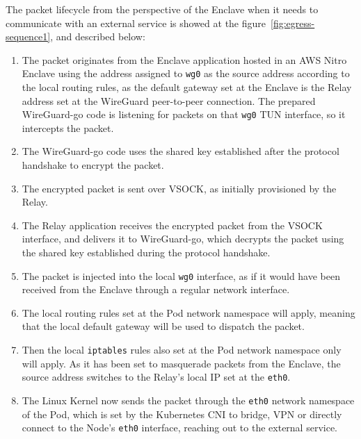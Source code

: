 \documentclass[a4paper, twocolumn]{article}
\begin{document}
The packet lifecycle from the perspective of the Enclave when it needs to
communicate with an external service is showed at the
figure~\ref{fig:egress-sequence1}, and described below:

\begin{enumerate}

\item The packet originates from the Enclave application hosted in an AWS Nitro
Enclave using the address assigned to \texttt{wg0} as the source address
according to the local routing rules, as the default gateway set at the
Enclave is the Relay address set at the WireGuard peer-to-peer connection.
The prepared WireGuard-go code is listening for packets on that \texttt{wg0}
TUN interface, so it intercepts the packet.

\item The WireGuard-go code uses the shared key established after the protocol
handshake to encrypt the packet.

\item The encrypted packet is sent over VSOCK, as initially provisioned by the
Relay.

\item The Relay application receives the encrypted packet from the VSOCK
interface, and delivers it to WireGuard-go, which decrypts the packet using the
shared key established during the protocol handshake.

\item The packet is injected into the local \texttt{wg0} interface, as if it
would have been received from the Enclave through a regular network
interface.

\item The local routing rules set at the Pod network namespace will apply,
meaning that the local default gateway will be used to dispatch the packet.

\item Then the local \texttt{iptables} rules also set at the Pod network namespace only
will apply. As it has been set to masquerade packets from the Enclave, the
source address switches to the Relay's local IP set at the \texttt{eth0}.

\item The Linux Kernel now sends the packet through the \texttt{eth0} network
namespace of the Pod, which is set by the Kubernetes CNI to bridge, VPN or
directly connect to the Node's \texttt{eth0} interface, reaching out to the
external service.

\end{enumerate}
\end{document}
